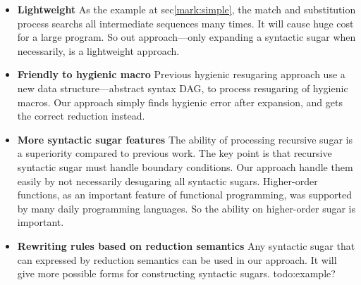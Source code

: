 \begin{itemize}
	\item {\bfseries Lightweight} As the example at sec\ref{mark:simple}, the match and substitution process searchs all intermediate sequences many times. It will cause huge cost for a large program. So out approach---only expanding a syntactic sugar when necessarily, is a lightweight approach.
	\item {\bfseries Friendly to hygienic macro} Previous hygienic resugaring approach use a new data structure---abstract syntax DAG, to process resugaring of hygienic macros. Our approach simply finds hygienic error after expansion, and gets the correct reduction instead.
	\item {\bfseries More syntactic sugar features} The ability of processing recursive sugar is a superiority compared to previous work. The key point is that recursive syntactic sugar must handle boundary conditions. Our approach handle them easily by not necessarily desugaring all syntactic sugars. Higher-order functions, as an important feature of functional programming, was supported by many daily programming languages. So the ability on higher-order sugar is important.
	\item {\bfseries Rewriting rules based on reduction semantics} Any syntactic sugar that can expressed by reduction semantics can be used in our approach. It will give more possible forms for constructing syntactic sugars. todo:example?
\end{itemize}
